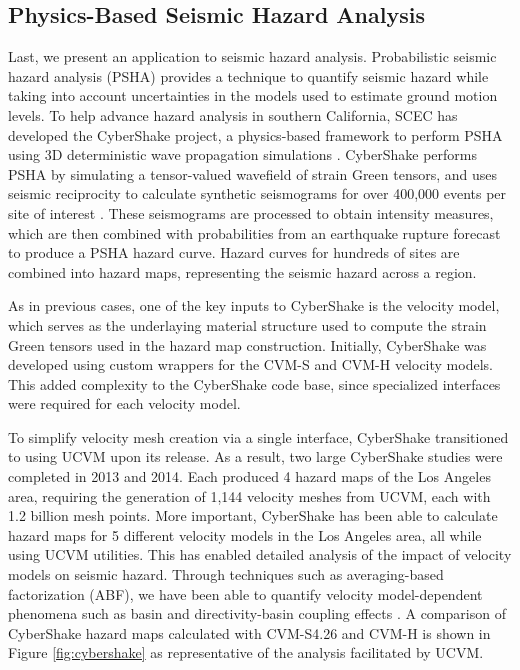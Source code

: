 
\subsection{Physics-Based Seismic Hazard Analysis}

Last, we present an application to seismic hazard analysis. Probabilistic seismic hazard analysis (PSHA) provides a technique to quantify seismic hazard while taking into account uncertainties in the models used to estimate ground motion levels. To help advance hazard analysis in southern California, SCEC has developed the CyberShake project, a physics-based framework to perform PSHA using 3D deterministic wave propagation simulations \citep{Graves_2011_PAG}.  CyberShake performs PSHA by simulating a tensor-valued wavefield of strain Green tensors, and uses seismic reciprocity to calculate synthetic seismograms for over 400,000 events per site of interest \citep{Zhao_2006_BSSA}. These seismograms are processed to obtain intensity measures, which are then combined with probabilities from an earthquake rupture forecast to produce a PSHA hazard curve. Hazard curves for hundreds of sites are combined into hazard maps, representing the seismic hazard across a region.

As in previous cases, one of the key inputs to CyberShake is the velocity model, which serves as the underlaying material structure used to compute the strain Green tensors used in the hazard map construction. Initially, CyberShake was developed using custom wrappers for the CVM-S and CVM-H velocity models. This added complexity to the CyberShake code base, since specialized interfaces were required for each velocity model.

To simplify velocity mesh creation via a single interface, CyberShake transitioned to using UCVM upon its release. As a result, two large CyberShake studies were completed in 2013 \citep{Callaghan_2013_Proc} and 2014.  Each produced 4 hazard maps of the Los Angeles area, requiring the generation of 1,144 velocity meshes from UCVM, each with 1.2 billion mesh points. More important, CyberShake has been able to calculate hazard maps for 5 different velocity models in the Los Angeles area, all while using UCVM utilities. This has enabled detailed analysis of the impact of velocity models on seismic hazard. Through techniques such as averaging-based factorization (ABF), we have been able to quantify velocity model-dependent phenomena such as basin and directivity-basin coupling effects \citep{Wang_2014_BSSA}. A comparison of CyberShake hazard maps calculated with CVM-S4.26 and CVM-H is shown in Figure \ref{fig:cybershake} as representative of the analysis facilitated by UCVM.



